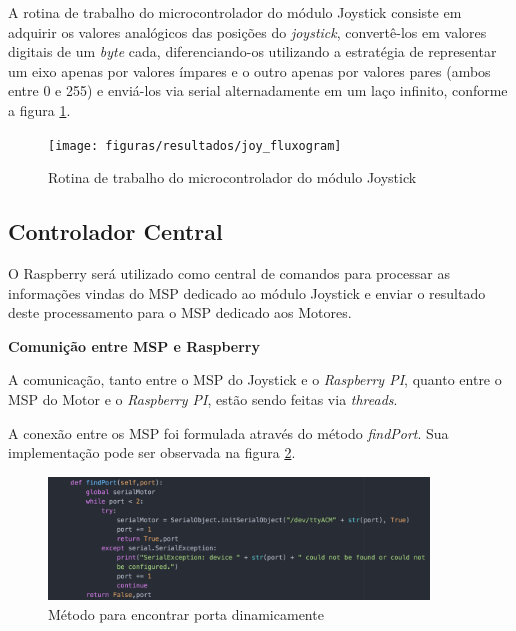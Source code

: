 A rotina de trabalho do microcontrolador do módulo Joystick consiste em adquirir os valores analógicos das posições do \textit{joystick}, convertê-los em valores digitais de um \textit{byte} cada, diferenciando-os utilizando a estratégia de representar um eixo apenas por valores ímpares e o outro apenas por valores pares (ambos entre 0 e 255) e enviá-los via serial alternadamente em um laço infinito, conforme a figura \ref{fig:joy_fluxogram}.

\begin{figure}[!htb]
\centering
\texttt{[image: figuras/resultados/joy\_fluxogram]}
\caption{Rotina de trabalho do microcontrolador do módulo Joystick}
\label{fig:joy_fluxogram}
\end{figure}

\subsection{Controlador Central}

  O Raspberry será utilizado como central de comandos para processar as informações vindas do MSP dedicado ao módulo Joystick e enviar o resultado deste processamento para o MSP dedicado aos Motores.

  \textbf{Comunição entre MSP e Raspberry}

  A comunicação, tanto entre o MSP do Joystick e o \textit{Raspberry PI}, quanto entre o MSP do Motor e o \textit{Raspberry PI}, estão sendo feitas via \textit{threads}.

  A conexão entre os MSP foi formulada através do método \textit{findPort}. Sua implementação pode ser observada na figura \ref{fig:find_port_method}.

  \begin{figure}[!htb]
    \centering
    \includegraphics[width=0.9\textwidth]{figuras/resultados/find_port_method}
    \caption{Método para encontrar porta dinamicamente}
    \label{fig:find_port_method}
  \end{figure}

